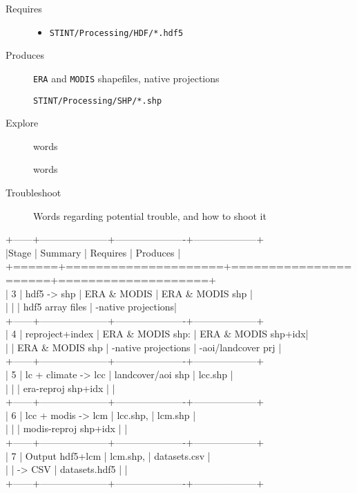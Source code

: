 \documentclass[twoside,a4paper]{refart}
\begin{document}
  \begin{description}
    \item [Requires]
      \begin{itemize}
        \item
          \texttt{STINT/Processing/HDF/*.hdf5}
      \end{itemize}
  
  
    \item [Produces]
      \texttt{ERA} and \texttt{MODIS} shapefiles, native projections
      
      \texttt{STINT/Processing/SHP/*.shp}
      

    \item [Explore]
      words
      
      words

    \item [Troubleshoot]
      Words regarding potential trouble, and how to shoot it
  \end{description}

 +------+---------------------+----------------------+--------------------+\\
    |Stage | Summary             | Requires             | Produces           |\\
    +======+=====================+======================+====================+\\
    | 3    | hdf5 -> shp         | ERA \& MODIS          | ERA \& MODIS shp    |\\
    |      |                     | hdf5 array files     | -native projections|\\
    +------+---------------------+----------------------+--------------------+\\
    | 4    | reproject+index     | ERA \& MODIS shp:     | ERA \& MODIS shp+idx|\\
    |      | ERA \& MODIS shp     | -native projections  | -aoi/landcover prj |\\
    +------+---------------------+----------------------+--------------------+\\
    | 5    | lc + climate -> lcc | landcover/aoi shp    | lcc.shp            |\\
    |      |                     | era-reproj shp+idx   |                    |\\
    +------+---------------------+----------------------+--------------------+\\
    | 6    | lcc + modis -> lcm  | lcc.shp,             | lcm.shp            |\\
    |      |                     | modis-reproj shp+idx |                    |\\
    +------+---------------------+----------------------+--------------------+\\
    | 7    |  Output hdf5+lcm    | lcm.shp,             | datasets.csv       |\\
    |      |  -> CSV             | datasets.hdf5        |                    |\\
    +------+---------------------+----------------------+--------------------+\\
\end{document}
